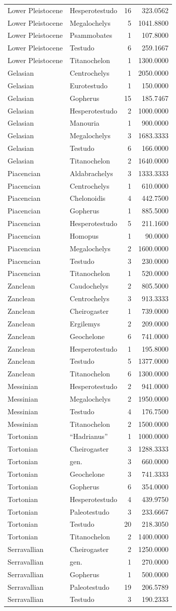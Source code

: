 \documentclass[]{article}
\begin{document}
\begin{longtable}[]{@{}llrr@{}}
Lower Pleistocene & Hesperotestudo & 16 & 323.0562\tabularnewline
Lower Pleistocene & Megalochelys & 5 & 1041.8800\tabularnewline
Lower Pleistocene & Psammobates & 1 & 107.8000\tabularnewline
Lower Pleistocene & Testudo & 6 & 259.1667\tabularnewline
Lower Pleistocene & Titanochelon & 1 & 1300.0000\tabularnewline
Gelasian & Centrochelys & 1 & 2050.0000\tabularnewline
Gelasian & Eurotestudo & 1 & 150.0000\tabularnewline
Gelasian & Gopherus & 15 & 185.7467\tabularnewline
Gelasian & Hesperotestudo & 2 & 1000.0000\tabularnewline
Gelasian & Manouria & 1 & 900.0000\tabularnewline
Gelasian & Megalochelys & 3 & 1683.3333\tabularnewline
Gelasian & Testudo & 6 & 166.0000\tabularnewline
Gelasian & Titanochelon & 2 & 1640.0000\tabularnewline
Piacencian & Aldabrachelys & 3 & 1333.3333\tabularnewline
Piacencian & Centrochelys & 1 & 610.0000\tabularnewline
Piacencian & Chelonoidis & 4 & 442.7500\tabularnewline
Piacencian & Gopherus & 1 & 885.5000\tabularnewline
Piacencian & Hesperotestudo & 5 & 211.1600\tabularnewline
Piacencian & Homopus & 1 & 90.0000\tabularnewline
Piacencian & Megalochelys & 2 & 1600.0000\tabularnewline
Piacencian & Testudo & 3 & 230.0000\tabularnewline
Piacencian & Titanochelon & 1 & 520.0000\tabularnewline
Zanclean & Caudochelys & 2 & 805.5000\tabularnewline
Zanclean & Centrochelys & 3 & 913.3333\tabularnewline
Zanclean & Cheirogaster & 1 & 739.0000\tabularnewline
Zanclean & Ergilemys & 2 & 209.0000\tabularnewline
Zanclean & Geochelone & 6 & 741.0000\tabularnewline
Zanclean & Hesperotestudo & 1 & 195.8000\tabularnewline
Zanclean & Testudo & 5 & 1377.0000\tabularnewline
Zanclean & Titanochelon & 6 & 1300.0000\tabularnewline
Messinian & Hesperotestudo & 2 & 941.0000\tabularnewline
Messinian & Megalochelys & 2 & 1950.0000\tabularnewline
Messinian & Testudo & 4 & 176.7500\tabularnewline
Messinian & Titanochelon & 2 & 1500.0000\tabularnewline
Tortonian & ``Hadrianus'' & 1 & 1000.0000\tabularnewline
Tortonian & Cheirogaster & 3 & 1288.3333\tabularnewline
Tortonian & gen. & 3 & 660.0000\tabularnewline
Tortonian & Geochelone & 3 & 741.3333\tabularnewline
Tortonian & Gopherus & 6 & 354.0000\tabularnewline
Tortonian & Hesperotestudo & 4 & 439.9750\tabularnewline
Tortonian & Paleotestudo & 3 & 233.6667\tabularnewline
Tortonian & Testudo & 20 & 218.3050\tabularnewline
Tortonian & Titanochelon & 2 & 1400.0000\tabularnewline
Serravallian & Cheirogaster & 2 & 1250.0000\tabularnewline
Serravallian & gen. & 1 & 270.0000\tabularnewline
Serravallian & Gopherus & 1 & 500.0000\tabularnewline
Serravallian & Paleotestudo & 19 & 206.5789\tabularnewline
Serravallian & Testudo & 3 & 190.2333\tabularnewline

\end{longtable}
\end{document}
